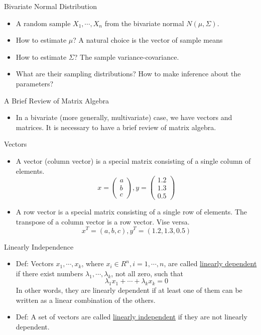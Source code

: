 \documentclass[landscape]{slides}
\begin{document}
\begin{slide}{\Large Bivariate Normal Distribution}
\begin{itemize}
    \item A random sample $X_1,\cdots,X_n$ from the bivariate normal $N(\mu,\Sigma)$.
    \item How to estimate $\mu$? A natural choice is the vector of sample means
    \item How to estimate $\Sigma$? The sample variance-covariance. 
    \item What are their sampling distributions? How to make inference about the parameters?
\end{itemize}
\end{slide}

\begin{slide}{\Large A Brief Review of Matrix Algebra}
\begin{itemize}
    \item In a bivariate (more generally, multivariate) case, we have vectors and matrices. It is necessary to have a brief review of matrix algebra.
\end{itemize}
\end{slide}

\begin{slide}{\Large Vectors}
\begin{itemize}
    \item A vector (column vector) is a special matrix consisting of a single column of elements.
    $$x= \begin{pmatrix}a\\b\\c\end{pmatrix} , y=\begin{pmatrix}1.2\\1.3\\0.5\end{pmatrix} $$
    \item A row vector is a special matrix consisting of a single row of elements. The transpose of a column vector is a row vector. Vise versa.
        $$x^T=(a,b,c), y^T=(1.2,1.3,0.5)$$
    \end{itemize}
\end{slide}


\begin{slide}{\Large Linearly Independence}
\begin{itemize}
    \item Def: Vectors $x_1,\cdots,x_k$, where $x_i \in R^n, i=1,\cdots,n$, are called \underline{linearly dependent} if there exist numbers $\lambda_1,\cdots,\lambda_k$, not all zero, such that
    $$\lambda_1x_1+\cdots+\lambda_kx_k=0$$
    In other words, they are linearly dependent if at least one of them can be written as a linear combination of the others.
    \item Def: A set of vectors are called \underline{linearly independent} if they are not linearly dependent.
\end{itemize}
\end{slide}
\end{document}

